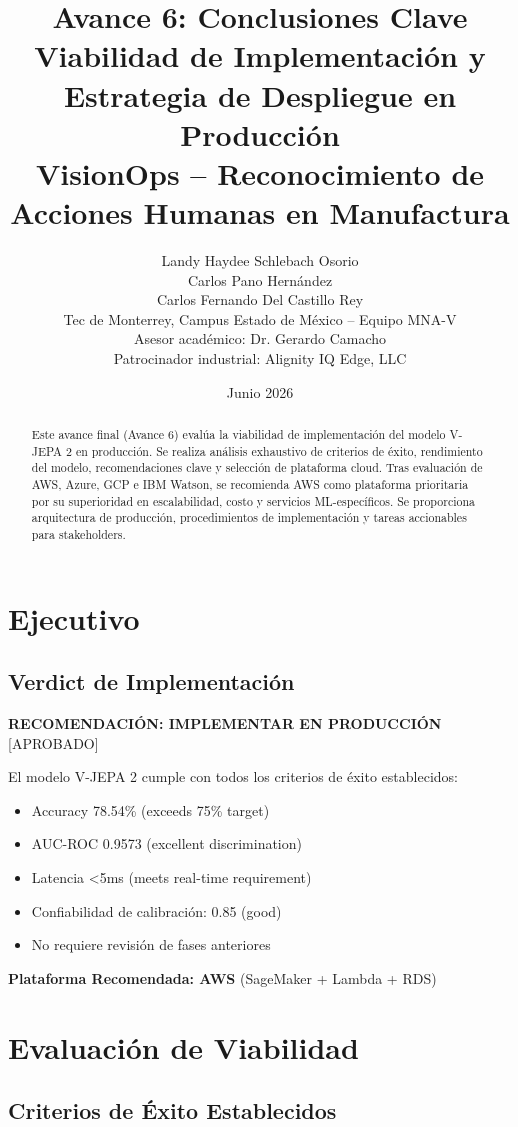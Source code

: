 \documentclass[11pt,letterpaper]{article}
\title{Avance 6: Conclusiones Clave \\
\large Viabilidad de Implementación y Estrategia de Despliegue en Producción \\
VisionOps -- Reconocimiento de Acciones Humanas en Manufactura}
\author{
  Landy Haydee Schlebach Osorio \\
  Carlos Pano Hernández \\
  Carlos Fernando Del Castillo Rey \\[0.5em]
  \small Tec de Monterrey, Campus Estado de México -- Equipo MNA-V \\
  \small Asesor académico: Dr. Gerardo Camacho \\
  \small Patrocinador industrial: Alignity IQ Edge, LLC
}
\date{Junio 2026}
\begin{document}
\maketitle

\begin{abstract}
Este avance final (Avance 6) evalúa la viabilidad de implementación del modelo V-JEPA 2 en producción. Se realiza análisis exhaustivo de criterios de éxito, rendimiento del modelo, recomendaciones clave y selección de plataforma cloud. Tras evaluación de AWS, Azure, GCP e IBM Watson, se recomienda AWS como plataforma prioritaria por su superioridad en escalabilidad, costo y servicios ML-específicos. Se proporciona arquitectura de producción, procedimientos de implementación y tareas accionables para stakeholders.
\end{abstract}

\section{Ejecutivo}

\subsection{Verdict de Implementación}

\textbf{RECOMENDACIÓN: IMPLEMENTAR EN PRODUCCIÓN} [APROBADO]

El modelo V-JEPA 2 cumple con todos los criterios de éxito establecidos:
\begin{itemize}
  \item Accuracy 78.54\% (exceeds 75\% target)
  \item AUC-ROC 0.9573 (excellent discrimination)
  \item Latencia <5ms (meets real-time requirement)
  \item Confiabilidad de calibración: 0.85 (good)
  \item No requiere revisión de fases anteriores
\end{itemize}

\textbf{Plataforma Recomendada: AWS} (SageMaker + Lambda + RDS)

\section{Evaluación de Viabilidad}

\subsection{Criterios de Éxito Establecidos}
\end{document}
